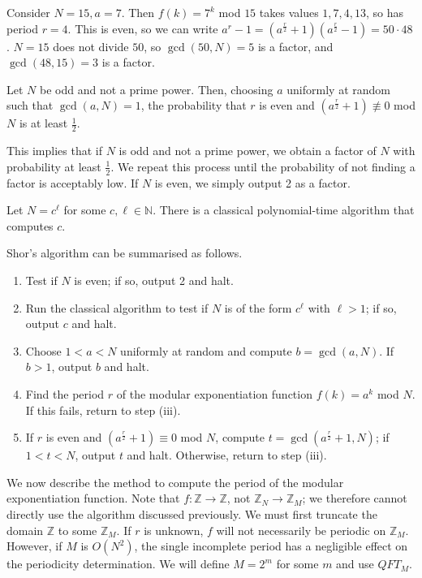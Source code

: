 Consider \( N = 15, a = 7 \).
Then \( f(k) = 7^k \) mod \( 15 \) takes values \( 1, 7, 4, 13 \), so has period \( r = 4 \).
This is even, so we can write \( a^r - 1 = (a^{\frac{r}{2}} + 1)(a^{\frac{r}{2}} - 1) = 50 \cdot 48 \).
\( N = 15 \) does not divide \( 50 \), so \( \gcd(50, N) = 5 \) is a factor, and \( \gcd(48, 15) = 3 \) is a factor.
\begin{theorem}
    Let \( N \) be odd and not a prime power.
    Then, choosing \( a \) uniformly at random such that \( \gcd(a,N) = 1 \), the probability that \( r \) is even and \( (a^{\frac{r}{2}} + 1) \not\equiv 0 \) mod \( N \) is at least \( \frac{1}{2} \).
\end{theorem}
This implies that if \( N \) is odd and not a prime power, we obtain a factor of \( N \) with probability at least \( \frac{1}{2} \).
We repeat this process until the probability of not finding a factor is acceptably low.
If \( N \) is even, we simply output 2 as a factor.
\begin{lemma}
    Let \( N = c^\ell \) for some \( c, \ell \in \mathbb N \).
    There is a classical polynomial-time algorithm that computes \( c \).
\end{lemma}
Shor's algorithm can be summarised as follows.
\begin{enumerate}
    \item Test if \( N \) is even; if so, output 2 and halt.
    \item Run the classical algorithm to test if \( N \) is of the form \( c^\ell \) with \( \ell > 1 \); if so, output \( c \) and halt.
    \item Choose \( 1 < a < N \) uniformly at random and compute \( b = \gcd(a,N) \).
    If \( b > 1 \), output \( b \) and halt.
    \item Find the period \( r \) of the modular exponentiation function \( f(k) = a^k \) mod \( N \).
    If this fails, return to step (iii).
    \item If \( r \) is even and \( (a^{\frac{r}{2}} + 1) \equiv 0 \) mod \( N \), compute \( t = \gcd(a^{\frac{r}{2}} + 1, N) \); if \( 1 < t < N \), output \( t \) and halt.
    Otherwise, return to step (iii).
\end{enumerate}
We now describe the method to compute the period of the modular exponentiation function.
Note that \( f \colon \mathbb Z \to \mathbb Z \), not \( \mathbb Z_N \to \mathbb Z_M \); we therefore cannot directly use the algorithm discussed previously.
We must first truncate the domain \( \mathbb Z \) to some \( \mathbb Z_M \).
If \( r \) is unknown, \( f \) will not necessarily be periodic on \( \mathbb Z_M \).
However, if \( M \) is \( O(N^2) \), the single incomplete period has a negligible effect on the periodicity determination.
We will define \( M = 2^m \) for some \( m \) and use \( QFT_M \).

